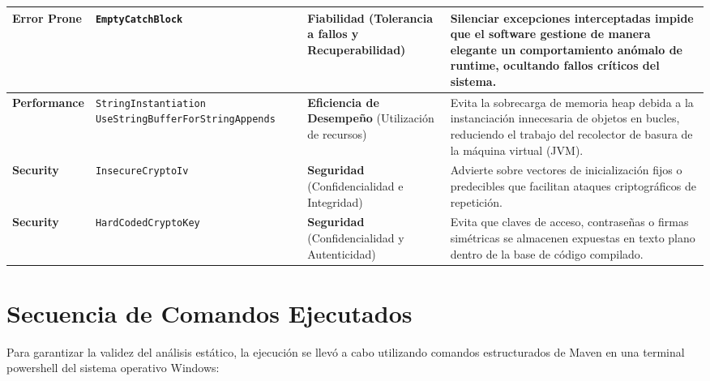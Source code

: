\documentclass[12pt,a4paper]{article}
\begin{document}
\begin{longtable}{p{2.2cm} p{4.2cm} p{4.0cm} p{4.0cm}}
\textbf{Error Prone} & 
\texttt{EmptyCatchBlock} & 
\textbf{Fiabilidad} (Tolerancia a fallos y Recuperabilidad) & 
Silenciar excepciones interceptadas impide que el software gestione de manera elegante un comportamiento anómalo de runtime, ocultando fallos críticos del sistema. \\
\midrule

\textbf{Performance} & 
\texttt{StringInstantiation} \newline
\texttt{UseStringBufferFor}\newline\texttt{StringAppends} & 
\textbf{Eficiencia de Desempeño} (Utilización de recursos) & 
Evita la sobrecarga de memoria heap debida a la instanciación innecesaria de objetos en bucles, reduciendo el trabajo del recolector de basura de la máquina virtual (JVM). \\
\midrule

\textbf{Security} & 
\texttt{InsecureCryptoIv} & 
\textbf{Seguridad} (Confidencialidad e Integridad) & 
Advierte sobre vectores de inicialización fijos o predecibles que facilitan ataques criptográficos de repetición. \\
\midrule

\textbf{Security} & 
\texttt{HardCodedCryptoKey} & 
\textbf{Seguridad} (Confidencialidad y Autenticidad) & 
Evita que claves de acceso, contraseñas o firmas simétricas se almacenen expuestas en texto plano dentro de la base de código compilado. \\
\end{longtable}

\newpage

\section{Secuencia de Comandos Ejecutados}
Para garantizar la validez del análisis estático, la ejecución se llevó a cabo utilizando comandos estructurados de Maven en una terminal powershell del sistema operativo Windows:
\end{document}

